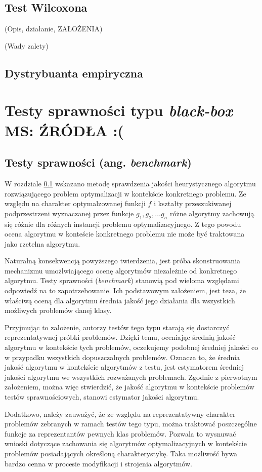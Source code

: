 \documentclass[12pt,a4paper]{report}
\begin{document}
{{{\subsection{Test Wilcoxona}
\label{Wilcoxon}
\par{
(Opis, działanie, ZAŁOŻENIA)
}
\par{
(Wady zalety)
}
\subsection{Dystrybuanta empiryczna}
\section{Testy sprawności typu \emph{black-box} MS: ŹRÓDŁA :(}
\subsection{Testy sprawności (ang. \emph{benchmark})}
\par{
W rozdziale \ref{Wilcoxon} wskazano metodę sprawdzenia jakości heurystycznego algorytmu rozwiązującego problem optymalizacji w kontekście konkretnego problemu. Ze względu na charakter optymalzowanej funkcji $f$ i kształty przeszukiwanej podprzestrzeni wyznaczanej przez funkcje $g_1,g_2, \ldots g_n$ różne algorytmy zachowują się różnie dla różnych instancji problemu optymalizacyjnego. Z tego powodu ocena algorytmu w konteście konkretnego problemu nie może być traktowana jako rzetelna algorytmu.
}
\par{
Naturalną konsekwencją powyższego twierdzenia, jest próba skonstruowania mechanizmu umożlwiającego ocenę algorytmów niezależnie od konkretnego algorytmu. Testy sprawności (\emph{benchmark}) stanowią pod wieloma względami odpowiedź na to zapotrzebowanie. Ich podstawowym założeniem, jest teza, że właściwą oceną dla algorytmu średnia jakość jego działania dla wszystkich możliwych problemów danej klasy.
}
\par{
Przyjmując to założenie, autorzy testów tego typu starają się dostarczyć reprezentatywnej próbki problemów. Dzięki temu, oceniając średnią jakość algorytmu w kontekście tych problemów, oczekujemy podobnej średniej jakości co w przypadku wszystkich dopuszczalnych problemów. Oznacza to, że średnia jakość algorytmu w kontekście algorytmów z testu, jest estymatorem średniej jakości algorytmu we wszystkich rozważanych problemach. Zgodnie z pierwotnym założeniem, można więc stwierdzić, że jakość algorytmu w kontekście problemów testów sprawnościowych, stanowi estymator jakości algorytmu.
}
\par{
Dodatkowo, należy zauważyć, że ze względu na reprezentatywny charakter problemów zebranych w ramach testów tego typu, można traktować poszczególne funkcje za reprezentantów pewnych klas problemów. Pozwala to wysnuwać wnioski dotyczące zachowania się algorytmów optymalizacyjnych w kontekście problemów posiadających określoną charakterystykę. Taka możliwość bywa bardzo cenna w procesie modyfikacji i strojenia algorytmów.
}
}}}
\end{document}
